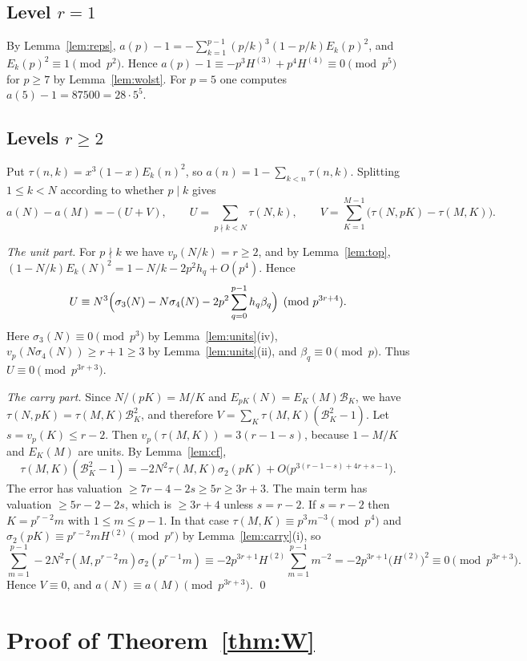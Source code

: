 \documentclass[11pt]{amsart}
\theoremstyle{definition}
\theoremstyle{remark}
\newcommand{\vp}{v_p}
\begin{document}
\subsection*{\texorpdfstring{Level $r=1$}{Level r=1}}
By Lemma~\ref{lem:reps}, $a(p)-1=-\sum_{k=1}^{p-1}(p/k)^3(1-p/k)E_k(p)^2$, and
$E_k(p)^2\equiv1\pmod{p^2}$. Hence $a(p)-1\equiv-p^3H^{(3)}+p^4H^{(4)}\equiv0\pmod{p^5}$ for
$p\ge7$ by Lemma~\ref{lem:wolst}. For $p=5$ one computes $a(5)-1=87500=28\cdot5^5$.

\subsection*{\texorpdfstring{Levels $r\ge2$}{Levels r at least 2}}
Put $\tau(n,k)=x^3(1-x)E_k(n)^2$, so $a(n)=1-\sum_{k<n}\tau(n,k)$. Splitting $1\le k<N$
according to whether $p\mid k$ gives
\[
a(N)-a(M)=-(U+V),\qquad U=\sum_{p\nmid k<N}\tau(N,k),\qquad
V=\sum_{K=1}^{M-1}\bigl(\tau(N,pK)-\tau(M,K)\bigr).
\]

\emph{The unit part.} For $p\nmid k$ we have $\vp(N/k)=r\ge2$, and by Lemma~\ref{lem:top},
$(1-N/k)E_k(N)^2=1-N/k-2p^2h_q+O(p^4)$. Hence
\[
U\equiv N^3\Bigl(\sigma_3(N)-N\sigma_4(N)-2p^2\sum_{q=0}^{p-1}h_q\beta_q\Bigr)\pmod{p^{3r+4}}.
\]
Here $\sigma_3(N)\equiv0\pmod{p^3}$ by Lemma~\ref{lem:units}(iv), $\vp(N\sigma_4(N))\ge r+1\ge3$
by Lemma~\ref{lem:units}(ii), and $\beta_q\equiv0\pmod p$. Thus $U\equiv0\pmod{p^{3r+3}}$.

\emph{The carry part.} Since $N/(pK)=M/K$ and $E_{pK}(N)=E_K(M)\mathcal B_K$, we have
$\tau(N,pK)=\tau(M,K)\mathcal B_K^2$, and therefore
$V=\sum_K\tau(M,K)(\mathcal B_K^2-1)$. Let $s=\vp(K)\le r-2$. Then
$\vp(\tau(M,K))=3(r-1-s)$, because $1-M/K$ and $E_K(M)$ are units. By Lemma~\ref{lem:cf},
\[
\tau(M,K)(\mathcal B_K^2-1)=-2N^2\tau(M,K)\sigma_2(pK)+O\bigl(p^{3(r-1-s)+4r+s-1}\bigr).
\]
The error has valuation $\ge 7r-4-2s\ge 5r\ge3r+3$. The main term has valuation
$\ge5r-2-2s$, which is $\ge 3r+4$ unless $s=r-2$. If $s=r-2$ then $K=p^{r-2}m$ with
$1\le m\le p-1$. In that case $\tau(M,K)\equiv p^3m^{-3}\pmod{p^4}$ and
$\sigma_2(pK)\equiv p^{r-2}mH^{(2)}\pmod{p^{r}}$ by Lemma~\ref{lem:carry}(i), so
\[
\sum_{m=1}^{p-1}-2N^2\tau(M,p^{r-2}m)\sigma_2(p^{r-1}m)\equiv
-2p^{3r+1}H^{(2)}\sum_{m=1}^{p-1}m^{-2}=-2p^{3r+1}\bigl(H^{(2)}\bigr)^2\equiv0\pmod{p^{3r+3}}.
\]
Hence $V\equiv0$, and $a(N)\equiv a(M)\pmod{p^{3r+3}}$. \qed

\section{Proof of Theorem~\ref{thm:W}}
\end{document}
